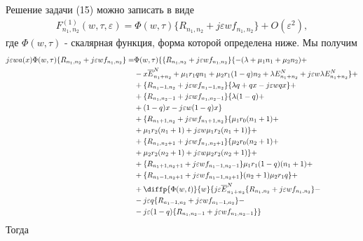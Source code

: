 Решение задачи (15) можно записать в виде
\begin{align}
F_{n_{1}, n_{2}}^{(1)}(w,\tau,\varepsilon)=\Phi (w,\tau)\{R_{n_{1}, n_{2}}+j\varepsilon w f_{n_{1}, n_{2}}\}+O(\varepsilon^2),
\end{align}
где $\Phi (w,\tau)$ - скалярная функция, форма которой определена ниже.
Мы получим \\
 \begin{equation}
	\begin{split}
		j\varepsilon wa(x) \Phi (w,\tau)\{R_{n_{1}, n_{2}}+j\varepsilon w f_{n_{1}, n_{2}}\}=
		&\Phi (w,\tau)\{\{R_{n_{1}, n_{2}}+j\varepsilon w f_{n_{1}, n_{2}}\}\{-(\lambda+\mu_{1}n_{1}+\mu_{2}n_{2}) +\\
		&-x\overline{E}_{n_{1}+n_{2}}^N+\mu_{1}r_{1}q n_{1}+ \mu_{2}r_{1}(1-q)n_{2}+ \lambda E_{n_{1}+n_{2}}^N +j\varepsilon w \lambda E_{n_{1}+n_{2}}^N \}+\\
		&+\{R_{n_{1}-1, n_{2}}+j\varepsilon w f_{n_{1}-1, n_{2}}\}\{\lambda q+ q  x-j\varepsilon wq x\}+\\
		&+\{R_{n_{1}, n_{2}-1}+j\varepsilon w f_{n_{1}, n_{2}-1}\}\{\lambda (1-q)+\\
		&+ (1-q) x -j\varepsilon w(1-q) x \}\\
		&+ \{R_{n_{1}+1, n_{2}}+j\varepsilon w f_{n_{1}+1, n_{2}}\}\{\mu_{1} r_{0}(n_{1}+1)+\\
		& + \mu_{1} r_{2}(n_{1}+1)+j\varepsilon w\mu_{1} r_{2}(n_{1}+1)\}+\\
		&+ \{R_{n_{1}, n_{2}+1}+j\varepsilon w f_{n_{1}, n_{2}+1}\}\{\mu_{2} r_{0}(n_{2}+1)+\\
		& + \mu_{2} r_{2} (n_{2}+1) +j\varepsilon w\mu_{2} r_{2} (n_{2}+1)\}+\\
		&+\{R_{n_{1}+1, n_{2}+1}+j\varepsilon w f_{n_{1}-1, n_{2}-1}\}\mu_{1} r_{1}(1-q)(n_{1}+1) +\\
		&+\{R_{n_{1}-1, n_{2}+1}+j\varepsilon w f_{n_{1}-1, n_{2}+1}\}(n_{2}+1)\mu_{2} r_{1}q\}  +\\
		&+ \diffp{\Phi(w,t)}{w}\{j\varepsilon \overline{E}_{n_{1}+n_{2}}^N\{R_{n_{1}, n_{2}}+j\varepsilon w f_{n_{1}, n_{2}}\}-\\
		&-  j\varepsilon q  \{R_{n_{1}-1, n_{2}}+j\varepsilon w f_{n_{1}-1, n_{2}}\}-\\
		&- j \varepsilon (1-q) \{R_{n_{1}, n_{2}-1}+j\varepsilon w f_{n_{1}, n_{2}-1}\}\}
	\end{split}
\end{equation}
Тогда
